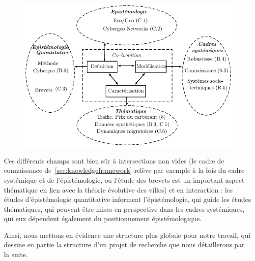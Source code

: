 \begin{figure}
	\begin{mdframed}
	\includegraphics[width=\linewidth]{Figures/Theory/metacadre_norefs.pdf}
	\medskip
	\end{mdframed}
\end{figure}



Ces différents champs sont bien sûr à intersections non vides (le cadre de connaissance de~\ref{sec:knowledgeframework} relève par exemple à la fois du cadre systémique et de l'épistémologie, ou l'étude des brevets est un important aspect thématique en lien avec la théorie évolutive des villes) et en interaction : les études d'épistémologie quantitative informent l'épistémologie, qui guide les études thématiques, qui peuvent être mises en perspective dans les cadres systémiques, qui eux dépendent également du positionnement épistémologique.

Ainsi, nous mettons en évidence une structure plus globale pour notre travail, qui dessine en partie la structure d'un projet de recherche que nous détaillerons par la suite.



